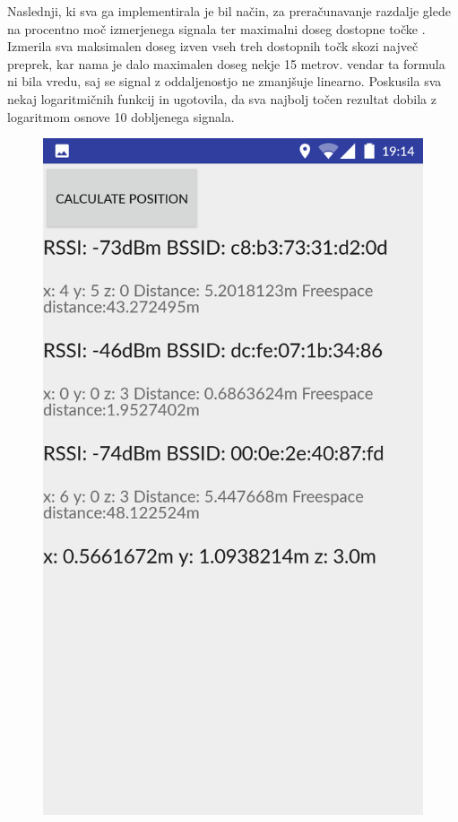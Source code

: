 \documentclass[11pt,a4paper,slovene]{article}
\begin{document}
Naslednji, ki sva ga implementirala je bil način, za preračunavanje razdalje glede na procentno moč izmerjenega signala ter maximalni doseg dostopne točke \cite{trilateriationTechnique}. Izmerila sva maksimalen doseg izven vseh treh dostopnih točk skozi največ preprek, kar nama je dalo maximalen doseg nekje 15 metrov. vendar ta formula ni bila vredu, saj se signal z oddaljenostjo ne zmanjšuje linearno. Poskusila sva nekaj logaritmičnih funkcij in ugotovila, da sva najbolj točen rezultat dobila z logaritmom osnove 10 dobljenega signala.

\begin{figure}[htb]
\centering
\includegraphics[scale=0.15]{slike/freespace1.png}

\end{figure}
\end{document}
